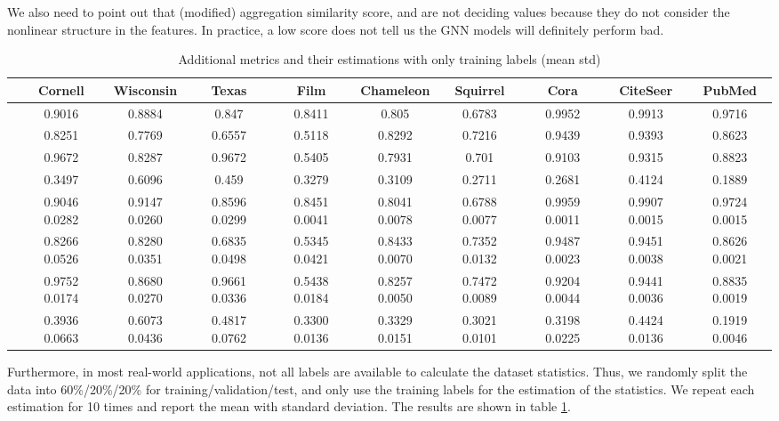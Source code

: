 \documentclass{article}
\newcommand{\0}{{\boldsymbol{0}}}
\newcommand{\6}{{\partial}}
\newcommand{\8}{{\infty}}
\newcommand{\4}{{\nabla}}
\begin{document}
We also need to point out that (modified) aggregation similarity score,  and  are not deciding values because they do not consider the nonlinear structure in the features. In practice, a low score does not tell us the GNN models will definitely perform bad.

\begin{table}[htbp]
  \centering
  \tiny
  \setlength{\tabcolsep}{2pt}
  \caption{Additional metrics and their estimations with only training labels (mean  std)}
    \begin{tabular}{c|ccccccccc}
    \toprule
    \toprule
          & Cornell & Wisconsin & Texas & Film  & Chameleon & Squirrel & Cora  & CiteSeer & PubMed \\
    \midrule
     & 0.9016 & 0.8884 & 0.847 & 0.8411 & 0.805 & 0.6783 & 0.9952 & 0.9913 & 0.9716 \\
     & 0.8251 & 0.7769 & 0.6557 & 0.5118 & 0.8292 & 0.7216 & 0.9439 & 0.9393 & 0.8623 \\
      & 0.9672 & 0.8287 & 0.9672 & 0.5405 & 0.7931 & 0.701 & 0.9103 & 0.9315 & 0.8823 \\
     & 0.3497 & 0.6096 & 0.459 & 0.3279 & 0.3109 & 0.2711 & 0.2681 & 0.4124 & 0.1889 \\
    \midrule
     & 0.9046  0.0282 & 0.9147  0.0260 & 0.8596  0.0299 & 0.8451  0.0041 & 0.8041  0.0078 & 0.6788  0.0077 & 0.9959  0.0011 & 0.9907  0.0015 & 0.9724  0.0015 \\
     & 0.8266  0.0526 & 0.8280  0.0351 & 0.6835  0.0498 & 0.5345  0.0421 & 0.8433  0.0070 & 0.7352  0.0132 & 0.9487  0.0023 & 0.9451  0.0038 & 0.8626  0.0021 \\
     & 0.9752  0.0174 & 0.8680  0.0270 & 0.9661  0.0336 & 0.5438  0.0184 & 0.8257  0.0050 & 0.7472  0.0089 & 0.9204  0.0044 & 0.9441  0.0036 & 0.8835  0.0019 \\
     & 0.3936  0.0663 & 0.6073  0.0436 & 0.4817  0.0762 & 0.3300  0.0136 & 0.3329  0.0151 & 0.3021  0.0101 & 0.3198  0.0225 & 0.4424  0.0136 & 0.1919  0.0046 \\
    \bottomrule
    \bottomrule
    \end{tabular}\label{tab:estimation_dataset_stats}\end{table} 
Furthermore, in most real-world applications, not all labels are available to calculate the dataset statistics. Thus, we randomly split the data into 60\%/20\%/20\% for training/validation/test, and only use the training labels for the estimation of the statistics. We repeat each estimation for 10 times and report the mean with standard deviation. The results are shown in table \ref{tab:estimation_dataset_stats}.
\iffalse
\end{document}
